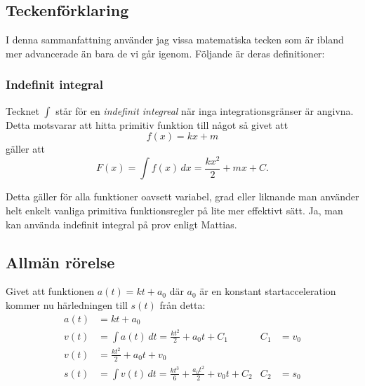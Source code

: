 \subsection{Teckenförklaring}
I denna sammanfattning använder jag vissa matematiska tecken som är ibland mer advancerade än bara de vi går igenom. Följande är deras definitioner:

\subsubsection*{Indefinit integral}
\label{def:indefint}
Tecknet $\int$ står för en \emph{indefinit integreal} när inga integrationsgränser är angivna. Detta motsvarar att hitta primitiv funktion till något så givet att \[f(x) = kx + m\] gäller att
\begin{equation*}
    F(x) = \int{f(x)}\, dx = \frac{kx^2}{2} + mx + C.
\end{equation*}

Detta gäller för alla funktioner oavsett variabel, grad eller liknande man använder helt enkelt vanliga primitiva funktionsregler på lite mer effektivt sätt. Ja, man kan använda indefinit integral på prov enligt Mattias.

\subsection{Allmän rörelse}
Givet att funktionen $a(t) = kt + a_0$ där $a_0$ är en konstant startacceleration kommer nu härledningen till $s(t)$ från detta:
\begin{align*}
    a(t) &= kt + a_0 \\
    v(t) &= \int{a(t)}\, dt = \frac{kt^2}{2} + a_0t + C_1 &C_1 &= v_0 \\
    v(t) &= \frac{kt^2}{2} + a_0t + v_0 \\
    s(t) &= \int{v(t)}\, dt = \frac{kt^3}{6} + \frac{a_0t^2}{2} + v_0t + C_2 &C_2 &= s_0
\end{align*}

\begin{center}
\end{center}

